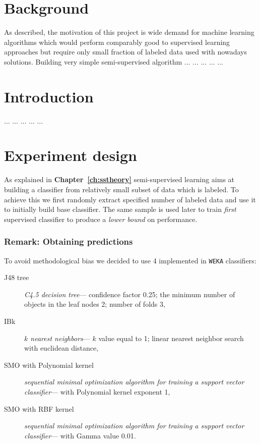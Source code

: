 \documentclass[12pt, a4paper, pdflatex]{report}
\begin{document}
\section{Background}
As described, the motivation of this project is wide demand for machine learning algorithms which would perform comparably good to supervised learning approaches but require only small fraction of labeled data used with nowadays solutions. Building very simple semi-supervised algorithm ... ... ... ... ...

\section{Introduction}
\lipsum[1] ... ... ... ... ...

\section{Experiment design}
As explained in \textbf{Chapter~\ref{ch:sstheory}} semi-supervised learning aims at building a classifier from relatively small subset of data which is labeled. To achieve this we first randomly extract specified number of labeled data and use it to initially build base classifier. The same sample is used later to train \emph{first} supervised classifier to produce a \emph{lower bound} on performance.

\subsubsection{Remark: Obtaining predictions}
To avoid methodological bias we decided to use 4 implemented in \texttt{WEKA} classifiers:
\begin{description}
\item[J48 tree] \emph{C4.5 decision tree}--- confidence factor 0.25; the minimum number of objects in the leaf nodes 2; number of folds 3,
\item[IBk] \emph{$k$ nearest neighbors}--- $k$ value equal to 1; linear nearest neighbor search with euclidean distance,
\item[SMO with Polynomial kernel] \emph{sequential minimal optimization algorithm for training a support vector classifier}--- with Polynomial kernel exponent 1,
\item[SMO with RBF kernel] \emph{sequential minimal optimization algorithm for training a support vector classifier}--- with Gamma value 0.01.
\end{description}
\end{document}
